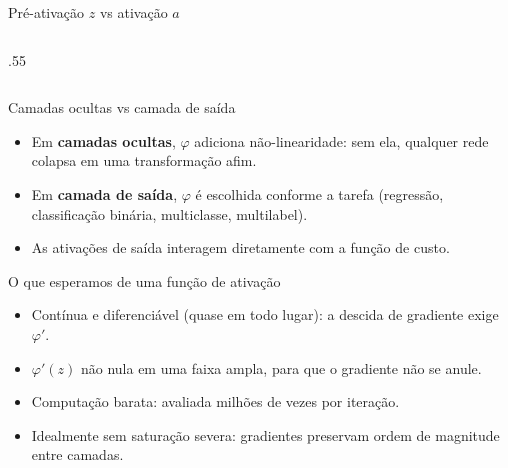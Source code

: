 \documentclass[aspectratio=169,xcolor=dvipsnames]{beamer}
\begin{document}
\begin{frame}{Pré-ativação $z$ vs ativação $a$}
\begin{columns}
\begin{column}{.55\linewidth}
{
        }
      \end{column}
    \end{columns}
  \end{frame}

  \begin{frame}{Camadas ocultas vs camada de saída}
    \begin{itemize}
      \item Em \textbf{camadas ocultas}, $\varphi$ adiciona não-linearidade: sem ela, qualquer
        rede colapsa em uma transformação afim.
      \item Em \textbf{camada de saída}, $\varphi$ é escolhida conforme a tarefa (regressão,
        classificação binária, multiclasse, multilabel).
      \item As ativações de saída interagem diretamente com a função de custo.
    \end{itemize}
  \end{frame}

  \begin{frame}{O que esperamos de uma função de ativação}
    \begin{itemize}
      \item Contínua e diferenciável (quase em todo lugar): a descida de gradiente exige $\varphi'$.
      \item $\varphi'(z)$ não nula em uma faixa ampla, para que o gradiente não se anule.
      \item Computação barata: avaliada milhões de vezes por iteração.
      \item Idealmente sem saturação severa: gradientes preservam ordem de magnitude entre camadas.
    \end{itemize}
  \end{frame}
\end{document}
